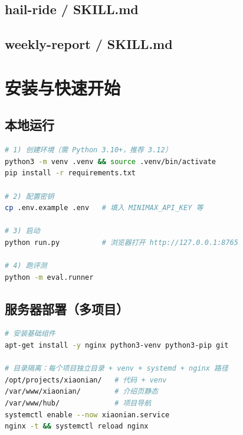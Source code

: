 \section{hail-ride / SKILL.md}

\section{weekly-report / SKILL.md}



\chapter{安装与快速开始}
\section{本地运行}
\begin{lstlisting}[language=bash,caption={本地快速开始},captionpos=b]
# 1) 创建环境（需 Python 3.10+，推荐 3.12）
python3 -m venv .venv && source .venv/bin/activate
pip install -r requirements.txt

# 2) 配置密钥
cp .env.example .env   # 填入 MINIMAX_API_KEY 等

# 3) 启动
python run.py          # 浏览器打开 http://127.0.0.1:8765

# 4) 跑评测
python -m eval.runner
\end{lstlisting}

\section{服务器部署（多项目）}
\begin{lstlisting}[language=bash,caption={服务器部署关键步骤},captionpos=b]
# 安装基础组件
apt-get install -y nginx python3-venv python3-pip git

# 目录隔离：每个项目独立目录 + venv + systemd + nginx 路径
/opt/projects/xiaonian/   # 代码 + venv
/var/www/xiaonian/        # 介绍页静态
/var/www/hub/             # 项目导航
systemctl enable --now xiaonian.service
nginx -t && systemctl reload nginx
\end{lstlisting}



